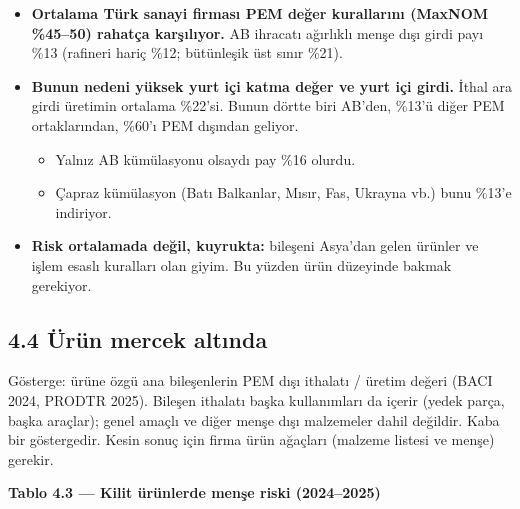 \begin{itemize}
\tightlist
\item
  \textbf{Ortalama Türk sanayi firması PEM değer kurallarını (MaxNOM \%45--50) rahatça karşılıyor.} AB ihracatı ağırlıklı menşe dışı girdi payı \%13 (rafineri hariç \%12; bütünleşik üst sınır \%21).
\item
  \textbf{Bunun nedeni yüksek yurt içi katma değer ve yurt içi girdi.} İthal ara girdi üretimin ortalama \%22'si. Bunun dörtte biri AB'den, \%13'ü diğer PEM ortaklarından, \%60'ı PEM dışından geliyor.

  \begin{itemize}
  \tightlist
  \item
    Yalnız AB kümülasyonu olsaydı pay \%16 olurdu.
  \item
    Çapraz kümülasyon (Batı Balkanlar, Mısır, Fas, Ukrayna vb.) bunu \%13'e indiriyor.
  \end{itemize}
\item
  \textbf{Risk ortalamada değil, kuyrukta:} bileşeni Asya'dan gelen ürünler ve işlem esaslı kuralları olan giyim. Bu yüzden ürün düzeyinde bakmak gerekiyor.
\end{itemize}

\hypertarget{02c_hazirlik-44-uxfcruxfcn-mercek-altux131nda}{%
\subsection{4.4 Ürün mercek altında}\label{02c_hazirlik-44-uxfcruxfcn-mercek-altux131nda}}

Gösterge: ürüne özgü ana bileşenlerin PEM dışı ithalatı / üretim değeri (BACI 2024, PRODTR 2025). Bileşen ithalatı başka kullanımları da içerir (yedek parça, başka araçlar); genel amaçlı ve diğer menşe dışı malzemeler dahil değildir. Kaba bir göstergedir. Kesin sonuç için firma ürün ağaçları (malzeme listesi ve menşe) gerekir.


\textbf{Tablo 4.3 --- Kilit ürünlerde menşe riski (2024--2025)}

\nopagebreak[4]

\begingroup\gbtablo\footnotesize

